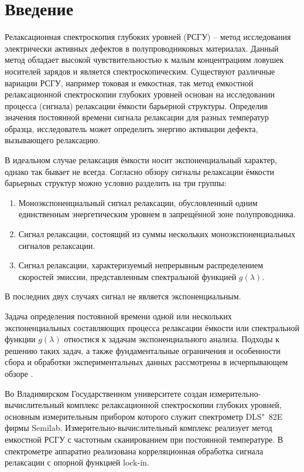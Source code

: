\section{Введение}
Релаксационная спектроскопия глубоких уровней (РСГУ) -- метод исследования 
электрически активных дефектов в полупроводниковых материалах. Данный метод 
обладает высокой чувствительностью к малым концентрациям ловушек носителей 
зарядов и является спектроскопическим. Существуют различные вариации РСГУ, 
например токовая и емкостная, так метод емкостной релаксационной спектроскопии 
глубоких уровней основан на исследовании процесса (сигнала) релаксации ёмкости 
барьерной структуры. Определив значения постоянной времени сигнала релаксации 
для разных температур образца, исследователь может определить энергию активации 
дефекта, вызывающего релаксацию. 

В идеальном случае релаксация ёмкости носит экспоненциальный характер, однако 
так бывает не всегда. Согласно обзору \cite{istratov_exp_analysis} 
сигналы релаксации ёмкости барьерных структур можно условно разделить на три 
группы:
    \begin{enumerate}
        \item Моноэкспоненциальный сигнал релаксации, обусловленный одним 
        единственным энергетическим уровнем в запрещённой зоне полупроводника.
        \item Сигнал релаксации, состоящий из суммы нескольких 
        моноэкспоненциальных сигналов релаксации.
        \item Сигнал релаксации, характеризуемый непрерывным распределением 
        скоростей эмиссии, представленным спектральной функцией $g(\lambda)$.
    \end{enumerate}
В последних двух случаях сигнал не является экспоненциальным. 

Задача определения постоянной времени одной или нескольких экспоненциальных 
составляющих процесса релаксации ёмкости или спектральной функции $g(\lambda)$ 
отностися к задачам экспоненциального анализа. Подходы к решению таких задач,
а также фундаментальные ограничения и особенности сбора и обработки 
экспериментальных данных рассмотрены в исчерпывающем обзоре 
\cite{istratov_exp_analysis}.

Во Владимирском Государственном университете создан измерительно-вычислительный
комплекс релаксационной спектроскопии глубоких уровней, основным измерительным
прибором которого служит спектрометр DLS"~82E фирмы Semilab. 
Измерительно-вычислительный комплекс реализует метод емкостной РСГУ с частотным
сканированием при постоянной температуре. В спектрометре аппаратно реализована
корреляционная обработка сигнала релаксации с опорной функцией lock-in. 

